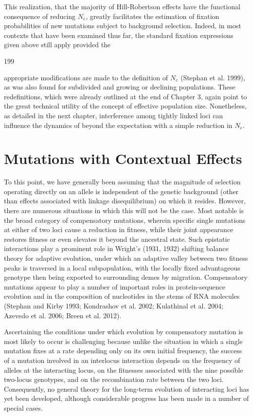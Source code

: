 \documentclass{article}
\begin{document}
This realization, that the majority of Hill-Robertson effects have the functional consequence of reducing  $ N_{e} $, greatly facilitates the estimation of fixation probabilities of new mutations subject to background selection. Indeed, in most contexts that have been examined thus far, the standard fixation expressions given above still apply provided the

199

appropriate modifications are made to the definition of  $ N_{e} $ (Stephan et al. 1999), as was also found for subdivided and growing or declining populations. These redefinitions, which were already outlined at the end of Chapter 3, again point to the great technical utility of the concept of effective population size. Nonetheless, as detailed in the next chapter, interference among tightly linked loci can influence the dynamics of beyond the expectation with a simple reduction in  $ N_{e} $.

\section{Mutations with Contextual Effects}
To this point, we have generally been assuming that the magnitude of selection operating directly on an allele is independent of the genetic background (other than effects associated with linkage disequilibrium) on which it resides. However, there are numerous situations in which this will not be the case. Most notable is the broad category of compensatory mutations, wherein specific single mutations at either of two loci cause a reduction in fitness, while their joint appearance restores fitness or even elevates it beyond the ancestral state. Such epistatic interactions play a prominent role in Wright's (1931, 1932) shifting balance theory for adaptive evolution, under which an adaptive valley between two fitness peaks is traversed in a local subpopulation, with the locally fixed advantageous genotype then being exported to surrounding demes by migration. Compensatory mutations appear to play a number of important roles in protein-sequence evolution and in the composition of nucleotides in the stems of RNA molecules (Stephan and Kirby 1993; Kondrashov et al. 2002; Kulathinal et al. 2004; Azevedo et al. 2006; Breen et al. 2012).

Ascertaining the conditions under which evolution by compensatory mutation is most likely to occur is challenging because unlike the situation in which a single mutation fixes at a rate depending only on its own initial frequency, the success of a mutation involved in an interlocus interaction depends on the frequency of alleles at the interacting locus, on the fitnesses associated with the nine possible two-locus genotypes, and on the recombination rate between the two loci. Consequently, no general theory for the long-term evolution of interacting loci has yet been developed, although considerable progress has been made in a number of special cases.
\end{document}
